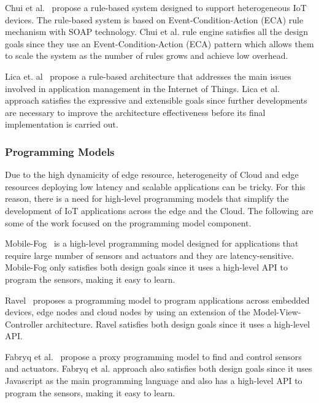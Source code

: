 Chui et al.~\cite{5277977} propose a rule-based system designed to support  heterogeneous IoT devices. The rule-based system is based on Event-Condition-Action (ECA) rule mechanism with SOAP technology. Chui et al. rule engine satisfies all the design goals since they use an Event-Condition-Action (ECA) pattern which allows them to scale the system as the number of rules grows and achieve low overhead.

Lica et. al~\cite{7314063} propose a rule-based architecture that addresses the main issues involved in application management in the Internet of Things. Lica et al. approach satisfies the expressive and extensible goals since further developments are necessary to improve the architecture effectiveness before its final implementation is carried out.

\subsubsection{Programming Models}
Due to the high dynamicity of edge resource, heterogeneity of Cloud and edge resources deploying low latency and scalable applications can be tricky. For this reason, there is a need for high-level programming models that simplify the development of IoT applications across the edge and the Cloud. The following are some of the work focused on the programming model component.

Mobile-Fog~\cite{Hong:2013} is a high-level programming model designed for applications that require large number of sensors and actuators and they are latency-sensitive. Mobile-Fog only satisfies both design goals since it uses a high-level API to program the sensors, making it easy to learn.

Ravel~\cite{ravel-riliskis-iotapp15} proposes a programming model to program applications across embedded devices, edge nodes and cloud nodes by  using an extension of the Model-View-Controller architecture. Ravel satisfies both design goals since it uses a high-level API. %

Fabryq et al.~\cite{Etemadi2014FabryqUP} propose a proxy programming model to find and control sensors and actuators. Fabryq et al. approach also satisfies both design goals since it uses Javascript as the main programming language and also has a high-level API to program the sensors, making it easy to learn.

